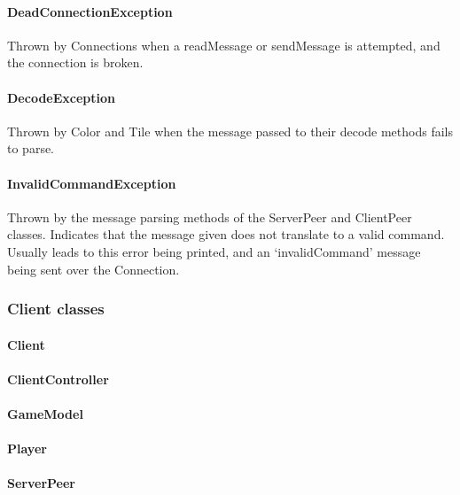 \documentclass[12pt, letterpaper]{article}
\begin{document}
    \paragraph{DeadConnectionException}
    Thrown by Connections when a readMessage or sendMessage is attempted, and the connection is broken.

    \paragraph{DecodeException}
    Thrown by Color and Tile when the message passed to their decode methods fails to parse.

    \paragraph{InvalidCommandException}
    Thrown by the message parsing methods of the ServerPeer and ClientPeer classes.
    Indicates that the message given does not translate to a valid command.
    Usually leads to this error being printed, and an `invalidCommand' message being sent over the Connection.



    \subsubsection{Client classes}

    \paragraph{Client}

    \paragraph{ClientController}

    \paragraph{GameModel}

    \paragraph{Player}

    \paragraph{ServerPeer}
\end{document}
